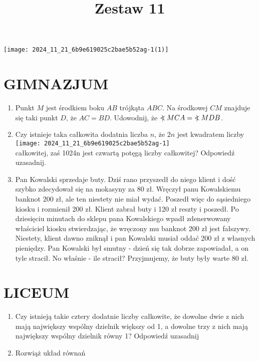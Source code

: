\documentclass[10pt]{article}
\title{Zestaw 11 }
\author{}
\date{}
\newcommand\Varangle{\mathop{{<\!\!\!\!\!\text{\small)}}\:}\nolimits}
\begin{document}
\maketitle
\begin{center}
\texttt{[image: 2024\_11\_21\_6b9e619025c2bae5b52ag-1(1)]}
\end{center}

\section*{GIMNAZJUM}
\begin{enumerate}
  \item Punkt \(M\) jest środkiem boku \(A B\) trójkąta \(A B C\). Na środkowej \(C M\) znajduje się taki punkt \(D\), że \(A C=B D\). Udowodnij, że \(\Varangle M C A=\Varangle M D B\).
  \item Czy istnieje taka całkowita dodatnia liczba \(n\), że \(2 n\) jest kwadratem liczby\\
\texttt{[image: 2024\_11\_21\_6b9e619025c2bae5b52ag-1]}\\
całkowitej, zaś 1024n jest czwartą potęgą liczby całkowitej? Odpowiedź uzasadnij.
  \item Pan Kowalski sprzedaje buty. Dziś rano przyszedł do niego klient i dość szybko zdecydował się na mokasyny za 80 zł. Wręczył panu Kowalskiemu banknot 200 zł, ale ten niestety nie miał wydać. Poszedł więc do sąsiedniego kiosku i rozmienił 200 zł. Klient zabrał buty i 120 zł reszty i poszedł. Po dziesięciu minutach do sklepu pana Kowalskiego wpadł zdenerwowany właściciel kiosku stwierdzając, że wręczony mu banknot 200 zł jest fałszywy. Niestety, klient dawno zniknął i pan Kowalski musiał oddać 200 zł z własnych pieniędzy. Pan Kowalski był smutny - dzień się tak dobrze zapowiadał, a on tyle stracił. No właśnie - ile stracił? Przyjmujemy, że buty były warte 80 zł.
\end{enumerate}

\section*{LICEUM}
\begin{enumerate}
  \item Czy istnieją takie cztery dodatnie liczby całkowite, że dowolne dwie z nich mają największy wspólny dzielnik większy od 1, a dowolne trzy z nich mają największy wspólny dzielnik równy 1? Odpowiedź uzasadnij
  \item Rozwiąż układ równań
\end{enumerate}
\end{document}
